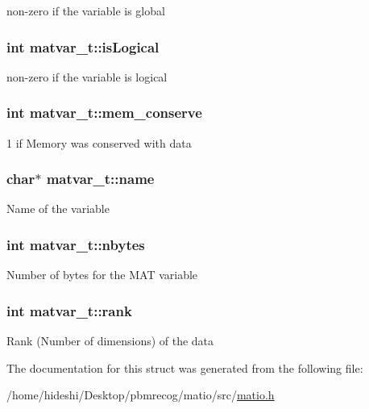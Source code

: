 non-\/zero if the variable is global \hypertarget{structmatvar__t_a866c1539e68073a837833d74cd4a65be}{
\subsubsection[{is\-Logical}]{\setlength{\rightskip}{0pt plus 5cm}int {\bf matvar\-\_\-t\-::is\-Logical}}}\label{structmatvar__t_a866c1539e68073a837833d74cd4a65be}
non-\/zero if the variable is logical \hypertarget{structmatvar__t_aff20e87a00691c97340ab07656a13ee7}{
\subsubsection[{mem\-\_\-conserve}]{\setlength{\rightskip}{0pt plus 5cm}int {\bf matvar\-\_\-t\-::mem\-\_\-conserve}}}\label{structmatvar__t_aff20e87a00691c97340ab07656a13ee7}
1 if \-Memory was conserved with data \hypertarget{structmatvar__t_a5f03073a500dae5824d0c7895ae60df9}{
\subsubsection[{name}]{\setlength{\rightskip}{0pt plus 5cm}char$\ast$ {\bf matvar\-\_\-t\-::name}}}\label{structmatvar__t_a5f03073a500dae5824d0c7895ae60df9}
\-Name of the variable \hypertarget{structmatvar__t_ae6e0987fef1e35a7e4d0a78b27648035}{
\subsubsection[{nbytes}]{\setlength{\rightskip}{0pt plus 5cm}int {\bf matvar\-\_\-t\-::nbytes}}}\label{structmatvar__t_ae6e0987fef1e35a7e4d0a78b27648035}
\-Number of bytes for the \-M\-A\-T variable \hypertarget{structmatvar__t_a84ba70c96ded13cc555fa75b768d9921}{
\subsubsection[{rank}]{\setlength{\rightskip}{0pt plus 5cm}int {\bf matvar\-\_\-t\-::rank}}}\label{structmatvar__t_a84ba70c96ded13cc555fa75b768d9921}
\-Rank (\-Number of dimensions) of the data 

\-The documentation for this struct was generated from the following file\-:\begin{DoxyCompactItemize}
\item 
/home/hideshi/\-Desktop/pbmrecog/matio/src/\hyperlink{matio_8h}{matio.\-h}\end{DoxyCompactItemize}
